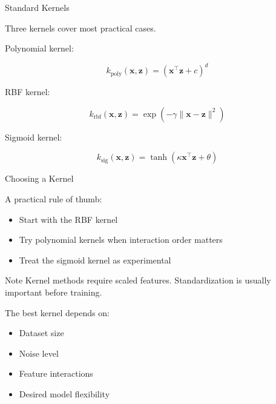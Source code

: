 \documentclass[aspectratio=169]{beamer}
\begin{document}

\begin{frame}{Standard Kernels}

Three kernels cover most practical cases.

\vspace{0.5em}

Polynomial kernel:

\[
k_{\text{poly}}(\mathbf{x},\mathbf{z})
=
(\mathbf{x}^{\top}\mathbf{z}+c)^d
\]

\vspace{0.5em}

RBF kernel:

\[
k_{\text{rbf}}(\mathbf{x},\mathbf{z})
=
\exp
\left(
-\gamma
\lVert
\mathbf{x}-\mathbf{z}
\rVert^2
\right)
\]

\vspace{0.5em}

Sigmoid kernel:

\[
k_{\text{sig}}(\mathbf{x},\mathbf{z})
=
\tanh
\left(
\kappa\mathbf{x}^{\top}\mathbf{z}
+
\theta
\right)
\]

\end{frame}


\begin{frame}{Choosing a Kernel}

A practical rule of thumb:

\vspace{0.5em}

\begin{itemize}
\item Start with the RBF kernel
\item Try polynomial kernels when interaction order matters
\item Treat the sigmoid kernel as experimental
\end{itemize}

\vspace{0.5em}

\begin{exampleblock}{Note}
Kernel methods require scaled features. Standardization is usually important before training.
\end{exampleblock}

\vspace{0.5em}

The best kernel depends on:

\begin{itemize}
\item Dataset size
\item Noise level
\item Feature interactions
\item Desired model flexibility
\end{itemize}

\end{frame}
\end{document}
